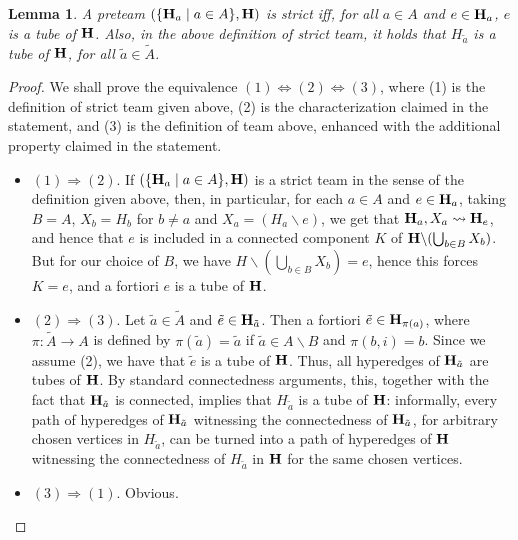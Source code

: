 \documentclass[11pt]{article}
\newtheorem{lemma}[theo]{Lemma}
\theoremstyle{definition}
\numberwithin{equation}{section}
\numberwithin{equation}{section}
\newcommand{\set}[1]{\{#1\}}
\newcommand{\setc}[2]{\set{#1 \mid #2}}
\newcommand{\Union}{\bigcup}		%
\newcommand{\restrH}[2]{\hyper{#1}\backslash #2}
\newcommand{\hyper}[1]{{\bf #1}}
\begin{document}
\begin{lemma} \label{Jovana-lemma} 
A preteam $(\setc{\hyper{H}_a}{a\in A},\hyper{H})$ is strict iff, for all $a \in A$ and $e\in\hyper{H}_a$,  $e$ is a tube of $\hyper{H}$. Also, in the above definition of strict team, it holds that $H_{\tilde{a}}$ is a tube of $\hyper{H}$, for all $\tilde{a}\in\tilde{A}$.
\end{lemma}
\begin{proof}  We shall prove the equivalence $(1)\Leftrightarrow (2)\Leftrightarrow (3)$, where (1) is the definition of strict team given above, (2) is the characterization claimed in the statement, and (3) is the definition of team above, enhanced with the additional property claimed in the statement.
\begin{itemize}
\item $(1)\Rightarrow (2)$. If $(\setc{\hyper{H}_a}{a\in A},\hyper{H})$ is a strict team in the sense of the definition given above, then, in particular, for each $a \in A$ and $e\in\hyper{H}_a$, taking $B=A$, $X_b=H_b$ for $b\neq a$ and $X_a=(H_a\backslash e)$, we get that $\hyper{H}_a,X_a\leadsto \hyper{H}_e$, and hence that $e$ is included in a connected component $K$ of $\restrH{H}{(\Union_{b\in B}X_b)}$. But for our choice of $B$, we have
$H\backslash(\Union_{b\in B}X_b)=e$, hence this forces $K=e$, and a fortiori $e$ is a tube of  $\hyper{H}$. 

\item $(2)\Rightarrow (3)$. Let $\tilde{a}\in\tilde{A}$ and $\tilde{e}\in \hyper{H}_{\tilde{a}}$. Then a fortiori $\tilde{e}\in \hyper{H}_{\pi(a)}$, where $\pi:\tilde{A}\rightarrow A$ is defined by $\pi(\tilde{a})=\tilde{a}$ if $\tilde{a}\in  A\backslash B$ and $\pi{(b,i)}=b$. Since we assume (2), we have that $\tilde{e}$ is a tube of $\hyper{H}$.  Thus, all hyperedges of $\hyper{H}_{\tilde{a}}$ are tubes of $\hyper{H}$. By standard connectedness arguments, this, together with the fact that $\hyper{H}_{\tilde{a}}$ is connected, 
implies that $H_{\tilde{a}}$ is a tube of  $\hyper{H}$: informally, every path of hyperedges of $\hyper{H}_{\tilde{a}}$ witnessing the connectedness of $\hyper{H}_{\tilde{a}}$, for arbitrary chosen vertices in  $H_{\tilde{a}}$, can be turned into a path of  hyperedges of $\hyper{H}$ witnessing the connectedness of $H_{\tilde{a}}$ in $\hyper{H}$ for the same chosen vertices.

\item $(3)\Rightarrow (1)$. Obvious.
\end{itemize}
\end{proof}
\end{document}
